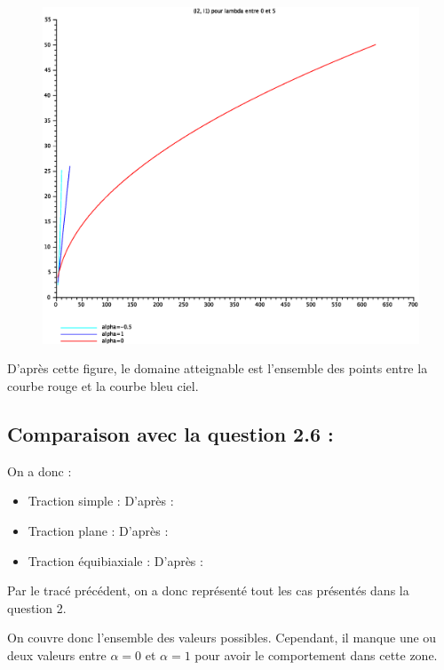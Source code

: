 \documentclass[a4paper,11pt]{article}
\begin{document}
\begin{figure}[!ht]
\centering\includegraphics[scale=0.5]{scilab/q5-1.eps}
\label{fig:5.1}
\end{figure}

D'après cette figure, le domaine atteignable est l'ensemble des points entre la courbe rouge et la courbe bleu ciel.

\subsection{Comparaison avec la question 2.6 :}
On a donc : 
\begin{itemize}
\item Traction simple : 
D'après : %
\item Traction plane : 
D'après : %
\item Traction équibiaxiale : 
D'après : %
\end{itemize}
Par le tracé précédent, on a donc représenté tout les cas présentés dans la question 2.

On couvre donc l'ensemble des valeurs possibles. Cependant, il manque une ou deux valeurs entre $\alpha = 0$ et $\alpha = 1$ pour avoir le comportement dans cette zone.

\subsection{}


\end{document}
